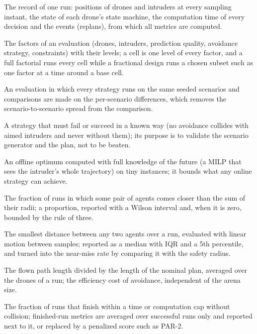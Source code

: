 \item[Execution log] The record of one run: positions of drones and intruders at every sampling instant, the state of each drone's state machine, the computation time of every decision and the events (replans), from which all metrics are computed.
\item[Experiment matrix] The factors of an evaluation (drones, intruders, prediction quality, avoidance strategy, constraints) with their levels; a cell is one level of every factor, and a full factorial runs every cell while a fractional design runs a chosen subset such as one factor at a time around a base cell.
\item[Paired design] An evaluation in which every strategy runs on the same seeded scenarios and comparisons are made on the per-scenario differences, which removes the scenario-to-scenario spread from the comparison.
\item[Sanity baseline] A strategy that must fail or succeed in a known way (no avoidance collides with aimed intruders and never without them); its purpose is to validate the scenario generator and the plan, not to be beaten.
\item[Oracle baseline] An offline optimum computed with full knowledge of the future (a MILP that sees the intruder's whole trajectory) on tiny instances; it bounds what any online strategy can achieve.
\item[Collision rate] The fraction of runs in which some pair of agents comes closer than the sum of their radii; a proportion, reported with a Wilson interval and, when it is zero, bounded by the rule of three.
\item[Minimum separation $d_{\min}$] The smallest distance between any two agents over a run, evaluated with linear motion between samples; reported as a median with IQR and a 5th percentile, and turned into the near-miss rate by comparing it with the safety radius.
\item[Path-length ratio $\rho_L$] The flown path length divided by the length of the nominal plan, averaged over the drones of a run; the efficiency cost of avoidance, independent of the arena size.
\item[Success rate (with a cap)] The fraction of runs that finish within a time or computation cap without collision; finished-run metrics are averaged over successful runs only and reported next to it, or replaced by a penalized score such as PAR-2.
